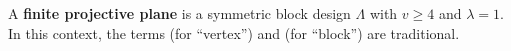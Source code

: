 A \textbf{finite projective plane} is a symmetric block design $\Lambda$ with $v \geq 4$ and $\lambda = 1$. In this context, the terms  (for ``vertex'') and  (for ``block'') are traditional.
